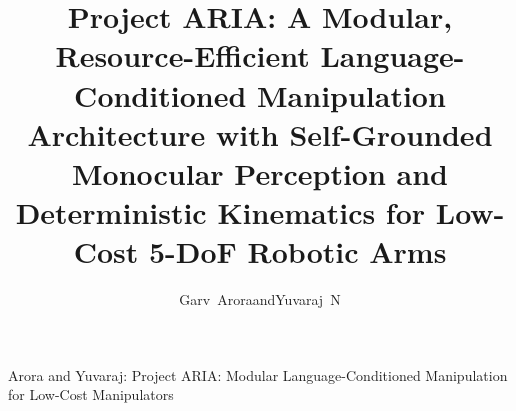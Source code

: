 \documentclass[journal]{IEEEtran}
\begin{document}
\title{Project ARIA: A Modular, Resource-Efficient Language-Conditioned Manipulation Architecture with Self-Grounded Monocular Perception and Deterministic Kinematics for Low-Cost 5-DoF Robotic Arms}

\author{Garv~Arora\quad and\quad Yuvaraj~N}

%
{Arora and Yuvaraj: Project ARIA: Modular Language-Conditioned Manipulation for Low-Cost Manipulators}

\maketitle
\end{document}
